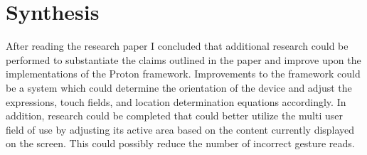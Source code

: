 \documentclass[11pt]{article}
\begin{document}
\vspace*{-.1in}
\section{Synthesis}
\label{sec:synthesis}
\vspace*{-.1in}

After reading the research paper I concluded that additional research could be performed to substantiate the claims outlined in the paper and improve upon the implementations of the Proton framework. Improvements to the framework could be a system which could determine the orientation of the device and adjust the expressions, touch fields, and location determination equations accordingly. In addition, research could be completed that could better utilize the multi user field of use by adjusting its active area based on the content currently displayed on the screen. This could possibly reduce the number of incorrect gesture reads.



\end{document}
